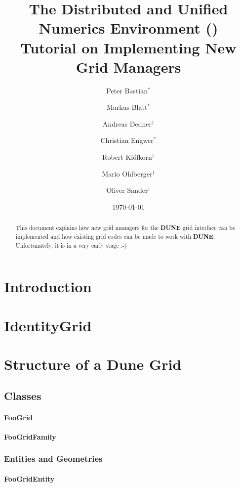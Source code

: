 \documentclass[11pt,a4paper,headinclude,footinclude,DIV16,normalheadings]{scrreprt}
\title{The Distributed and Unified Numerics Environment (\Dune{}) \\
Tutorial on Implementing New Grid Managers}
\author{Peter Bastian$^\ast$ \and 
Markus Blatt$^\ast$ \and
Andreas Dedner$^\dagger$ \and 
Christian Engwer$^\ast$ \and  
Robert Kl\"ofkorn$^\dagger$ \and 
Mario Ohlberger$^\dagger$ \and  
Oliver Sander$^\ddagger$}
\date{\today}
\newcommand{\Dune}{{\sf\bfseries DUNE}\xspace}
\begin{document}
\maketitle

\begin{abstract}
This document explains how new grid managers for the \Dune grid interface
can be implemented and how existing grid codes can be made to work with
\Dune.  Unfortunately, it is in a very early stage :-)
\end{abstract}

\tableofcontents


\chapter{Introduction}

\chapter{IdentityGrid}

\chapter{Structure of a Dune Grid}

\section{Classes}

\subsubsection{FooGrid}

\subsubsection{FooGridFamily}

\subsection{Entities and Geometries}

\subsubsection{FooGridEntity}
\end{document}
